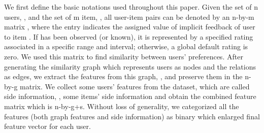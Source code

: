 \documentclass[a4paper,fleqn]{cas-dc}
\begin{document}
We first define the basic notations used throughout this paper. Given the set of n users,  , and the set of m item, , all user-item pairs can be denoted by an n-by-m matrix  , where the entry   indicates the assigned value of implicit feedback of user  to item . If  has been observed (or known), it is represented by a specified rating associated in a specific range and interval; otherwise, a global default rating is zero. We used this matrix to find similarity between users' preferences. After generating the similarity graph which represents users as nodes and the relations as edges, we extract the features from this graph, , and preserve them in the n-by-g matrix. We collect some users' features from the dataset, which are called side information, , some items' side information  and obtain the combined feature matrix which is n-by-g+s. Without loss of generality, we categorized all the features (both graph features and side information) as binary which enlarged final feature vector for each user.
\end{document}

